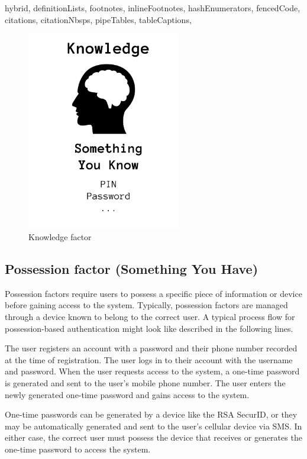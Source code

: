 \documentclass[
  digital,     %
  oneside,     %
  nosansbold,  %
  nocolorbold, %
  lof,         %
  lot,         %
]{fithesis4}
\begin{document}
\begin{markdown*}{%
  hybrid,
  definitionLists,
  footnotes,
  inlineFootnotes,
  hashEnumerators,
  fencedCode,
  citations,
  citationNbsps,
  pipeTables,
  tableCaptions,
}
\begin{figure}[htbp]
  \centering
  \includegraphics[width=0.6\textwidth]{img/knowledge-final.png}
  \caption{Knowledge factor}
  \label{fig:knowledge-factor}
\end{figure}

\newpage
\subsection{Possession factor (Something You Have)}
Possession factors require users to possess a specific piece of information or device before gaining access to the system.
Typically, possession factors are managed through a device known to belong to the correct user.
A typical process flow for possession-based authentication might look like described in the following lines.

The user registers an account with a password and their phone number recorded at the time of registration.
The user logs in to their account with the username and password.
When the user requests access to the system, a one-time password is generated and sent to the user's mobile phone number.
The user enters the newly generated one-time password and gains access to the system.

One-time passwords can be generated by a device like the RSA SecurID, or they may be automatically generated and sent to the user's cellular device via SMS.
In either case, the correct user must possess the device that receives or generates the one-time password to access the system.


\end{markdown*}
\end{document}
